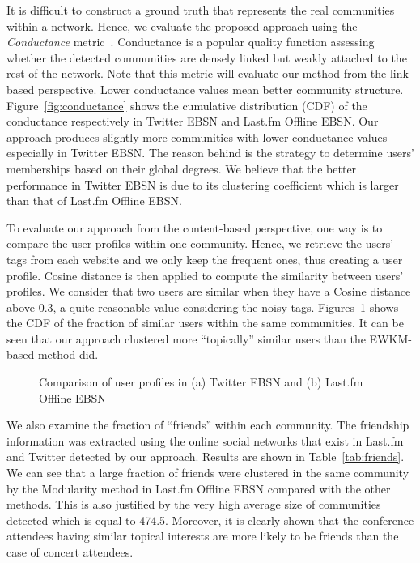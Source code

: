 It is difficult to construct a ground truth that represents the real communities within a network. Hence, we evaluate the proposed approach using the \emph{Conductance} metric~\cite{Leskovec:WWW08}. Conductance is a popular quality function assessing whether the detected communities are densely linked but weakly attached to the rest of the network. Note that this metric will evaluate our method from the link-based perspective. Lower conductance values mean better community structure. Figure~\ref{fig:conductance} shows the cumulative distribution (CDF) of the conductance respectively in Twitter EBSN and Last.fm Offline EBSN. Our approach produces slightly more communities with lower conductance values especially in Twitter EBSN. The reason behind is the strategy to determine users' memberships based on their global degrees. We believe that the better performance in Twitter EBSN is due to its clustering coefficient which is larger than that of Last.fm Offline EBSN.

To evaluate our approach from the content-based perspective, one way is to compare the user profiles within one community. Hence, we retrieve the users' tags from each website and we only keep the frequent ones, thus creating a user profile. Cosine distance is then applied to compute the similarity between users' profiles. We consider that two users are similar when they have a Cosine distance above 0.3, a quite reasonable value considering the noisy tags. Figures~\ref{fig:comp-user} shows the CDF of the fraction of similar users within the same communities. It can be seen that our approach clustered more ``topically'' similar users than the EWKM-based method did. 


\begin{figure}[htb]
\centering
{}
\caption{Comparison of user profiles in (a) Twitter EBSN and (b) Last.fm Offline EBSN}
\label{fig:comp-user}
\end{figure}

We also examine the fraction of ``friends''  within each community. The friendship information was extracted using the online social networks that exist in Last.fm and Twitter detected by our approach. Results are shown in Table~\ref{tab:friends}. We can see that a large fraction of friends were clustered in the same community by the Modularity method in Last.fm Offline EBSN compared with the other methods. This is also justified by the very high average size of communities detected which is equal to 474.5. Moreover, it is clearly shown that the conference attendees having similar topical interests are more likely to be friends than the case of concert attendees. 

